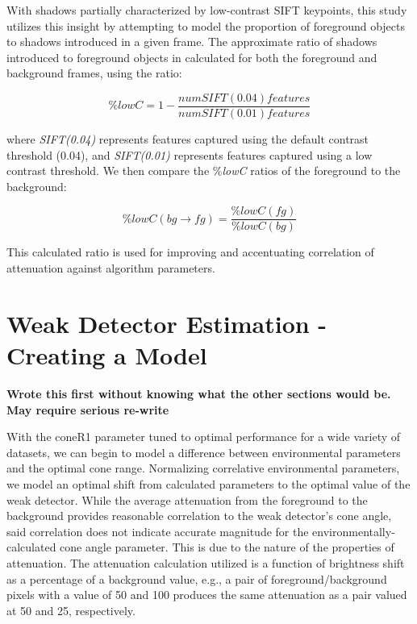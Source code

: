 \documentclass[12pt]{report}
\begin{document}
With shadows partially characterized by low-contrast SIFT keypoints, this study utilizes this insight by attempting to model the proportion of foreground objects to shadows introduced in a given frame. The approximate ratio of shadows introduced to foreground objects in calculated for both the foreground and background frames, using the ratio:

\begin{equation}
\%lowC = 1 - \dfrac{num SIFT(0.04) features}{num SIFT(0.01) features}
\end{equation}

where \textit{SIFT(0.04)} represents features captured using the default contrast threshold (0.04), and \textit{SIFT(0.01)} represents features captured using a low contrast threshold. We then compare the \%\textit{lowC} ratios of the foreground to the background:

\begin{equation}
\%lowC(bg \rightarrow fg) = \dfrac{\%lowC(fg)}{\%lowC(bg)}
\end{equation}

This calculated ratio is used for improving and accentuating correlation of attenuation against algorithm parameters.

\section{Weak Detector Estimation - Creating a Model}

\textbf{Wrote this first without knowing what the other sections would be. May require serious re-write}

With the coneR1 parameter tuned to optimal performance for a wide variety of datasets, we can begin to model a difference between environmental parameters and the optimal cone range. Normalizing correlative environmental parameters, we model an optimal shift from calculated parameters to the optimal value of the weak detector. While the average attenuation from the foreground to the background provides reasonable correlation to the weak detector's cone angle, said correlation does not indicate accurate magnitude for the environmentally-calculated cone angle parameter. This is due to the nature of the properties of attenuation. The attenuation calculation utilized is a function of brightness shift as a percentage of a background value, e.g., a pair of foreground/background pixels with a value of 50 and 100 produces the same attenuation as a pair valued at 50 and 25, respectively.
\end{document}
